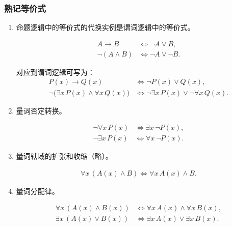 \subsubsection{熟记等价式}
\begin{enumerate}
	\item 命题逻辑中的等价式的代换实例是谓词逻辑中的等价式。
	
	\begin{align*}
		A \to B &\Leftrightarrow \neg A \lor B,\\
		\neg (A \land B) &\Leftrightarrow \neg A \lor \neg B.
	\end{align*}
	
	对应到谓词逻辑可写为：
	\begin{align*}
		P(x)\to Q(x) &\Leftrightarrow \neg P(x)\lor Q(x),\\
		\neg\bigl(\exists x\,P(x)\land \forall x\,Q(x)\bigr) 
		&\Leftrightarrow \neg\exists x\,P(x)\lor \neg\forall x\,Q(x).
	\end{align*}
	
	\item 量词否定转换。
	
	\begin{align*}
		\neg \forall x\,P(x) &\Leftrightarrow \exists x\,\neg P(x),\\
		\neg \exists x\,P(x) &\Leftrightarrow \forall x\,\neg P(x).
	\end{align*}
	
	\item 量词辖域的扩张和收缩（略）。
	
	\begin{align*}
		\forall x\,(A(x)\land B)\Leftrightarrow \forall x\,A(x)\land B.
	\end{align*}
	
	\item 量词分配律。
	
	\begin{align*}
		\forall x\,(A(x)\land B(x))
		&\Leftrightarrow
		\forall x\,A(x)\land \forall x\,B(x),\\
		\exists x\,(A(x)\lor B(x))
		&\Leftrightarrow
		\exists x\,A(x)\lor \exists x\,B(x).
	\end{align*}
	
\end{enumerate}


